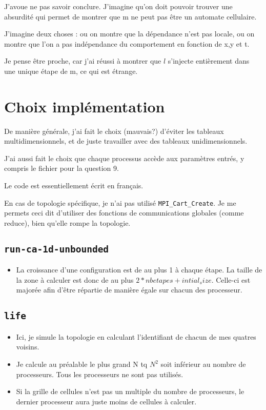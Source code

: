 \documentclass{article}
\begin{document}
J'avoue ne pas savoir conclure. J'imagine qu'on doit pouvoir trouver une absurdité qui permet de montrer que m ne peut pas être un automate cellulaire.

J'imagine deux choses : ou on montre que la dépendance n'est pas locale, ou on montre que l'on a pas indépendance du comportement en fonction de x,y et t.

Je pense être proche, car j'ai réussi à montrer que $l$ s'injecte entièrement dans une unique étape de m, ce qui est étrange.

\section*{Choix implémentation}
De manière générale, j'ai fait le choix (mauvais?) d'éviter les tableaux multidimensionnels, et de juste travailler avec des tableaux unidimensionnels.

J'ai aussi fait le choix que chaque processus accède aux paramètres entrés, y compris le fichier pour la question 9.

Le code est essentiellement écrit en français.

En cas de topologie spécifique, je n'ai pas utilisé \verb+MPI_Cart_Create+. Je me permets ceci dit d'utiliser des fonctions de communications globales (comme reduce), bien qu'elle rompe la topologie.

\subsection*{\texttt{run-ca-1d-unbounded}}
\begin{itemize}
	\item La croissance d'une configuration est de au plus 1 à chaque étape. La taille de la zone à calculer est donc de au plus $2*nbetapes + intial_size$. Celle-ci est majorée afin d’être répartie de manière égale sur chacun des processeur. 
\end{itemize}

\subsection*{\texttt{life}}
\begin{itemize}
	\item Ici, je simule la topologie en calculant l'identifiant de chacun de mes quatres voisins.
  \item Je calcule au préalable le plus grand N tq $N^2$ soit inférieur au nombre de processeurs. Tous les processeurs ne sont pas utilisés.
  \item Si la grille de cellules n'est pas un multiple du nombre de processeurs, le dernier processeur aura juste moins de cellules à calculer.
\end{itemize}
		
\end{document}
